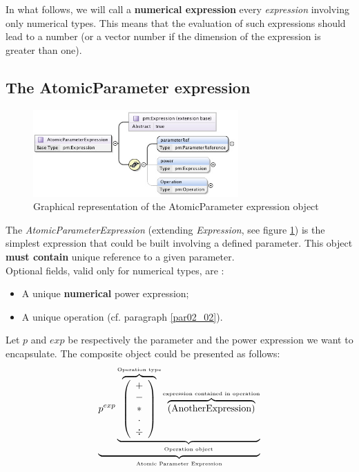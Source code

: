 \documentclass[a4paper,11pt] {ivoa}
\begin{document}
 In what follows, we will call a {\bf numerical expression} every {\it
expression} involving only numerical types. This means that the evaluation of such expressions
should lead to a number (or a vector number if the dimension of the expression is greater than
one).\\


\subsection{The AtomicParameter expression}\label{par02_01}
\begin{figure}[htbp]
\begin{center}
\includegraphics[width=0.7\textwidth]{pictures/AtomicParameter.jpg} 
\caption{Graphical representation of the AtomicParameter expression object}
\label{Pic-AtomicParameter}
\end{center}
\end{figure}
The {\it AtomicParameterExpression} (extending {\it Expression}, see figure
\ref{Pic-AtomicParameter}) is the simplest expression that could be built involving a defined
parameter. This object {\bf must contain} unique reference to a given parameter.\\

Optional fields, valid only for numerical types, are :
\begin{itemize}
\item A unique {\bf numerical} power expression;
\item A unique operation (cf. paragraph \ref{par02_02}).\\
\end{itemize}
Let $p$ and $exp$ be respectively the parameter and the power expression we want to encapsulate. The
composite object could be presented as follows:
\begin{equation}\label{eq01}
 \underbrace{  p^{exp} \underbrace{  \overbrace{\left( \begin{array}{c} + \\ - \\ \ast  \\ \cdot \\ \div   \end{array} \right) }^{\mbox{\tiny Operation type}}
 \overbrace{    \left( \mbox{AnotherExpression}\right) }^{\mbox{\tiny expression contained in operation}}   }_{\mbox{\tiny Operation object}}}_{\mbox{\tiny Atomic Parameter Expression}}
\end{equation}
\end{document}
